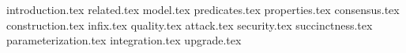 {introduction.tex}
{related.tex}
{model.tex}
{predicates.tex}
{properties.tex}
{consensus.tex}
{construction.tex}
{infix.tex}
{quality.tex}
{attack.tex}
{security.tex}
{succinctness.tex}
{parameterization.tex}
{integration.tex}
\ifieee\else
{upgrade.tex}
\fi


